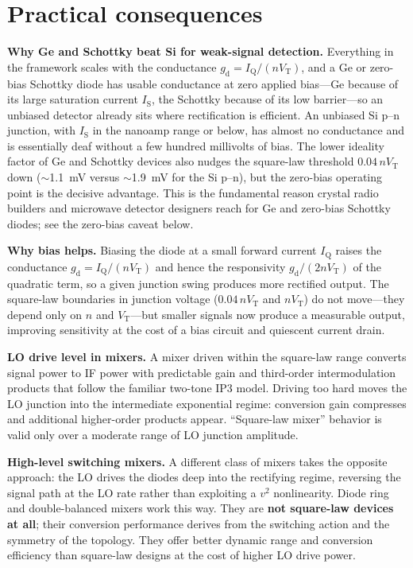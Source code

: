 \documentclass[12pt]{article}
\newcommand{\IS}{I_{\mathrm{S}}}
\newcommand{\VT}{V_{\mathrm{T}}}
\newcommand{\IQ}{I_{\mathrm{Q}}}
\newcommand{\gd}{g_{\mathrm{d}}}
\begin{document}
\section*{Practical consequences}

\textbf{Why Ge and Schottky beat Si for weak-signal detection.}
Everything in the framework scales with the conductance $\gd = \IQ/(n\VT)$, and a Ge or zero-bias Schottky diode has usable conductance at zero applied bias---Ge because of its large saturation current $\IS$, the Schottky because of its low barrier---so an unbiased detector already sits where rectification is efficient.
An unbiased Si p--n junction, with $\IS$ in the nanoamp range or below, has almost no conductance and is essentially deaf without a few hundred millivolts of bias.
The lower ideality factor of Ge and Schottky devices also nudges the square-law threshold $0.04\,n\VT$ down ($\sim$\SI{1.1}{\milli\volt} versus $\sim$\SI{1.9}{\milli\volt} for the Si p--n), but the zero-bias operating point is the decisive advantage.
This is the fundamental reason crystal radio builders and microwave detector designers reach for Ge and zero-bias Schottky diodes; see the zero-bias caveat below.

\textbf{Why bias helps.}
Biasing the diode at a small forward current $\IQ$ raises the conductance $\gd = \IQ/(n\VT)$ and hence the responsivity $\gd/(2n\VT)$ of the quadratic term, so a given junction swing produces more rectified output.
The square-law boundaries in junction voltage ($0.04\,n\VT$ and $n\VT$) do not move---they depend only on $n$ and $\VT$---but smaller signals now produce a measurable output, improving sensitivity at the cost of a bias circuit and quiescent current drain.

\textbf{LO drive level in mixers.}
A mixer driven within the square-law range converts signal power to IF power with predictable gain and third-order intermodulation products that follow the familiar two-tone IP3 model.
Driving too hard moves the LO junction into the intermediate exponential regime: conversion gain compresses and additional higher-order products appear.
``Square-law mixer'' behavior is valid only over a moderate range of LO junction amplitude.

\textbf{High-level switching mixers.}
A different class of mixers takes the opposite approach: the LO drives the diodes deep into the rectifying regime, reversing the signal path at the LO rate rather than exploiting a $v^2$ nonlinearity.
Diode ring and double-balanced mixers work this way.
They are \textbf{not square-law devices at all}; their conversion performance derives from the switching action and the symmetry of the topology.
They offer better dynamic range and conversion efficiency than square-law designs at the cost of higher LO drive power.
\end{document}
